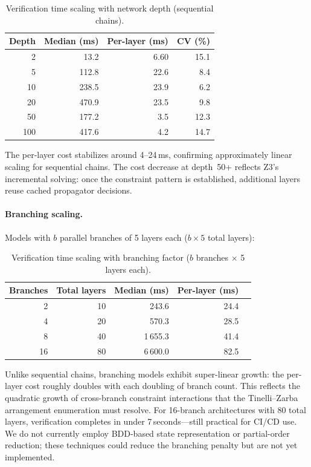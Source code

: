 \documentclass[11pt]{article}
\begin{document}
\begin{table}[h]
\centering
\caption{Verification time scaling with network depth (sequential chains).}
\label{tab:depth-scaling}
\small
\begin{tabular}{@{}rrrr@{}}
\toprule
\textbf{Depth} & \textbf{Median (ms)} & \textbf{Per-layer (ms)} & \textbf{CV (\%)} \\
\midrule
2   &  13.2 & 6.60 &  15.1 \\
5   & 112.8 & 22.6 &  8.4 \\
10  & 238.5 & 23.9 &  6.2 \\
20  & 470.9 & 23.5 &  9.8 \\
50  & 177.2 &  3.5 & 12.3 \\
100 & 417.6 &  4.2 & 14.7 \\
\bottomrule
\end{tabular}
\end{table}

The per-layer cost stabilizes around 4--24\,ms, confirming
approximately linear scaling for sequential chains.  The cost
decrease at depth~50+ reflects Z3's incremental solving: once
the constraint pattern is established, additional layers reuse
cached propagator decisions.

\paragraph{Branching scaling.}
Models with $b$ parallel branches of 5 layers each ($b \times 5$
total layers):

\begin{table}[h]
\centering
\caption{Verification time scaling with branching factor
  ($b$ branches $\times$ 5 layers each).}
\label{tab:branch-scaling}
\small
\begin{tabular}{@{}rrrrr@{}}
\toprule
\textbf{Branches} & \textbf{Total layers} & \textbf{Median (ms)} &
  \textbf{Per-layer (ms)} \\
\midrule
 2 &  10 &   243.6 & 24.4 \\
 4 &  20 &   570.3 & 28.5 \\
 8 &  40 & 1\,655.3 & 41.4 \\
16 &  80 & 6\,600.0 & 82.5 \\
\bottomrule
\end{tabular}
\end{table}

Unlike sequential chains, branching models exhibit super-linear
growth: the per-layer cost roughly doubles with each doubling
of branch count.  This reflects the quadratic growth of cross-branch
constraint interactions that the Tinelli--Zarba arrangement
enumeration must resolve.  For 16-branch architectures with 80
total layers, verification completes in under 7\,seconds---still
practical for CI/CD use.  We do not currently employ BDD-based
state representation or partial-order reduction; these techniques
could reduce the branching penalty but are not yet implemented.
\end{document}
